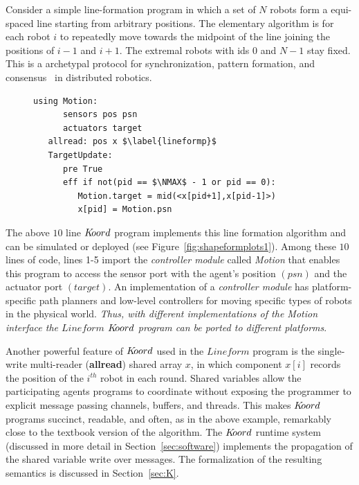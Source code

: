 Consider a simple line-formation program in which a set of $N$ robots form a equi-spaced line starting from arbitrary positions. The elementary algorithm is for each robot $i$ to repeatedly move towards the midpoint of the line joining the positions of $i-1$ and $i+1$. The extremal robots with ids $0$ and $N-1$ stay fixed. This is a archetypal protocol for synchronization, pattern formation, and consensus~\cite{Tsitsiklis:1986,Blondel,Magnusbook2010,Fax} in distributed robotics.
%
\begin{figure}
\begin{lstlisting}[label=lineform,caption=Lineform $\lgname$ program]
   using Motion:
      sensors pos psn
      actuators target
   allread: pos x $\label{lineformp}$
   TargetUpdate:
      pre True
      eff if not(pid == $\NMAX$ - 1 or pid == 0):
         Motion.target = mid(<x[pid+1],x[pid-1]>)
         x[pid] = Motion.psn
\end{lstlisting}
\end{figure}
The above $10$ line  $K\kern-2pt oord$ program implements this line formation algorithm and can be simulated or deployed (see Figure~\ref{fig:shapeformplots1}). Among these $10$ lines of code, lines 1-5 import the {\em controller module\/} called {\em Motion\/} that enables this program to access the sensor port with the agent's position $(\mathit{psn})$ and the actuator port $(\mathit{target})$. An implementation of  a {\em controller module\/} has platform-specific path planners and low-level controllers for moving specific types of robots in the physical world. {\em Thus, with different implementations of the {\em Motion\/} interface the $\mathit{Lineform}$ $K\kern-2pt oord$  program can be ported to different platforms\/}. 

Another powerful feature of $K\kern-2pt oord$ used in the $\mathit{Lineform}$ program is the single-write multi-reader ({\bf allread}) shared array $x$, in which component $x[i]$ records the position of the $i^{th}$ robot in each round.  Shared variables allow the participating agents programs to coordinate without exposing the programmer to explicit message passing channels, buffers, and threads. This makes $K\kern-2pt oord$ programs succinct, readable, and often, as in the  above example, remarkably close to the textbook version of the algorithm. The $K\kern-2pt oord$ runtime system (discussed in more detail in Section~\ref{sec:software}) implements the propagation of  the shared variable write over messages. The formalization of the resulting semantics is discussed in Section~\ref{sec:K}.

